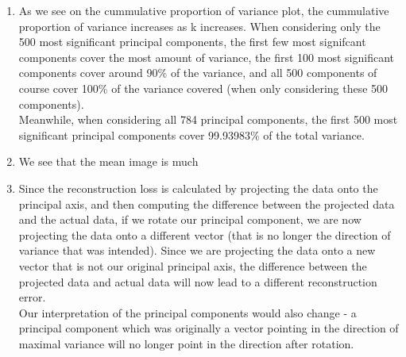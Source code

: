 \documentclass[submit]{harvardml}
\begin{document}
\begin{enumerate}
  \item As we see on the cummulative proportion of variance plot, the cummulative proportion of variance increases as k increases. When considering only the 500 most significant principal components, the first few most signifcant components cover the most amount of variance, the first 100 most significant components cover around 90\% of the variance, and all 500 components of course cover 100\% of the variance covered (when only considering these 500 components). \\
  Meanwhile, when considering all 784 principal components, the first 500 most significant principal components cover 99.93983\% of the total variance.
  
  \item 
  We see that the mean image is much 
  
  \item 
  Since the reconstruction loss is calculated by projecting the data onto the principal axis, and then computing the difference between the projected data and the actual data, if we rotate our principal component, we are now projecting the data onto a different vector (that is no longer the direction of variance that was intended). Since we are projecting the data onto a new vector that is not our original principal axis, the difference between the projected data and actual data will now lead to a different reconstruction error. \\
  Our interpretation of the principal components would also change - a principal component which was originally a vector pointing in the direction of maximal variance will no longer point in the direction after rotation. 
\end{enumerate}

\newpage
\end{document}
